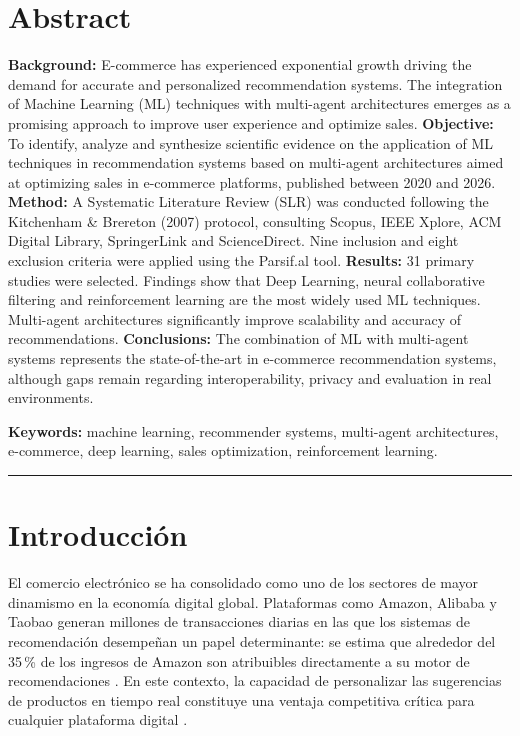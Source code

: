 \documentclass[12pt, a4paper]{article}
\begin{document}
\section*{Abstract}
\noindent
\textbf{Background:} E-commerce has experienced exponential growth driving
the demand for accurate and personalized recommendation systems. The
integration of Machine Learning (ML) techniques with multi-agent architectures
emerges as a promising approach to improve user experience and optimize sales.
\textbf{Objective:} To identify, analyze and synthesize scientific evidence on
the application of ML techniques in recommendation systems based on multi-agent
architectures aimed at optimizing sales in e-commerce platforms, published
between 2020 and 2026.
\textbf{Method:} A Systematic Literature Review (SLR) was conducted following
the Kitchenham \& Brereton (2007) protocol, consulting Scopus, IEEE Xplore,
ACM Digital Library, SpringerLink and ScienceDirect. Nine inclusion and eight
exclusion criteria were applied using the Parsif.al tool.
\textbf{Results:} 31 primary studies were selected. Findings show that Deep
Learning, neural collaborative filtering and reinforcement learning are the most
widely used ML techniques. Multi-agent architectures significantly improve
scalability and accuracy of recommendations.
\textbf{Conclusions:} The combination of ML with multi-agent systems represents
the state-of-the-art in e-commerce recommendation systems, although gaps remain
regarding interoperability, privacy and evaluation in real environments.

\vspace{0.4em}
\noindent\textbf{Keywords:} machine learning, recommender systems, multi-agent
architectures, e-commerce, deep learning, sales optimization, reinforcement
learning.

\noindent\rule{\linewidth}{1pt}\vspace{1em}

\section{Introducci\'on}

El comercio electr\'onico se ha consolidado como uno de los sectores de mayor
dinamismo en la econom\'ia digital global. Plataformas como Amazon, Alibaba
y Taobao generan millones de transacciones diarias en las que los sistemas de
recomendaci\'on desempe\~nan un papel determinante: se estima que alrededor
del 35\,\% de los ingresos de Amazon son atribuibles directamente a su motor
de recomendaciones \cite{Girish2025}. En este contexto, la capacidad de
personalizar las sugerencias de productos en tiempo real constituye una ventaja
competitiva cr\'itica para cualquier plataforma digital \cite{Halachev2024}.
\end{document}
